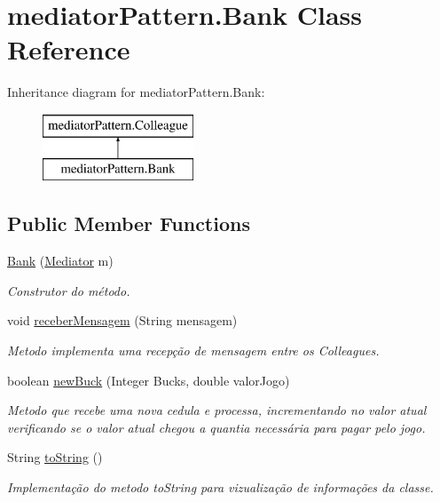 \hypertarget{classmediator_pattern_1_1_bank}{}\section{mediator\+Pattern.\+Bank Class Reference}
\label{classmediator_pattern_1_1_bank}
Inheritance diagram for mediator\+Pattern.\+Bank\+:\begin{figure}[H]
\begin{center}
\leavevmode
\includegraphics[height=2.000000cm]{classmediator_pattern_1_1_bank}
\end{center}
\end{figure}
\subsection*{Public Member Functions}
\begin{DoxyCompactItemize}
\item 
\mbox{\hyperlink{classmediator_pattern_1_1_bank_ae4ad12d1d757ea70252a43b77278e2f7}{Bank}} (\mbox{\hyperlink{interfacemediator_pattern_1_1_mediator}{Mediator}} m)
\begin{DoxyCompactList}\small\item\em Construtor do método. \end{DoxyCompactList}\item 
void \mbox{\hyperlink{classmediator_pattern_1_1_bank_a6a7daed810dd886ff48fb95a1adc977c}{receber\+Mensagem}} (String mensagem)
\begin{DoxyCompactList}\small\item\em Metodo implementa uma recepção de mensagem entre os Colleagues. \end{DoxyCompactList}\item 
boolean \mbox{\hyperlink{classmediator_pattern_1_1_bank_afe945c98e30b089256042309b907154d}{new\+Buck}} (Integer Bucks, double valor\+Jogo)
\begin{DoxyCompactList}\small\item\em Metodo que recebe uma nova cedula e processa, incrementando no valor atual verificando se o valor atual chegou a quantia necessária para pagar pelo jogo. \end{DoxyCompactList}\item 
String \mbox{\hyperlink{classmediator_pattern_1_1_bank_a8851099b55fb54ca7b0c053745411804}{to\+String}} ()
\begin{DoxyCompactList}\small\item\em Implementação do metodo to\+String para vizualização de informações da classe. \end{DoxyCompactList}\end{DoxyCompactItemize}
